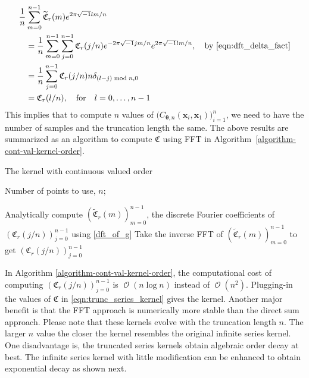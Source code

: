 \documentclass{iitthesis}          %
\DeclareMathOperator{\Order}{{\mathcal O}}
\newcommand{\bm}[1]{\boldsymbol{#1}}
\newcommand{\vtheta}{{\bm{\theta}}}
\newcommand{\vx}{\bm{x}}
\begin{document}
\begin{align*}
\frac{1}{n} &\sum_{m=0}^{n-1} \widetilde{\mathfrak{C}}_{r} (m) e^{2 \pi\sqrt{-1} lm/n} \\
& = \frac{1}{n} \sum_{m=0}^{n-1} 
\sum_{j=0}^{n-1} \mathfrak{C}_{r} (j/n) e^{- 2 \pi\sqrt{-1} jm/n}
e^{2 \pi\sqrt{-1} lm/n}, \quad \text{by \eqref{eqn:dft_delta_fact}}  \\
& = \frac{1}{n}  \sum_{j=0}^{n-1} \mathfrak{C}_{r} (j/n) n \delta_{(l-j) \bmod n, 0} \\
& = \mathfrak{C}_{r} (l/n), \quad \text{for} \quad l=0,\dots,n-1
\end{align*}
This implies that to compute $n$ values of $\biggl( C_{\vtheta, n}(\vx_i, \vx_1) \biggr)_{i=1}^n$, we need to have the number of samples and the truncation length the same. 
The above results are summarized as an algorithm to compute $\mathfrak{C}$ using FFT in Algorithm~\ref{algorithm-cont-val-kernel-order}.
\begin{algorithm}
	\caption{The kernel with continuous valued order}\label{algorithm-cont-val-kernel-order}
	\begin{algorithmic}[1]
	
	\Require
	Number of points to use, $n$; 

	\State Analytically compute $\left(\widetilde{\mathfrak{C}}_{r}(m)\right)_{m=0}^{n-1}$, the discrete Fourier coefficients of $\left(\mathfrak{C}_r(j/n)\right)_{j=0}^{n-1}$ using \eqref{dft_of_g}
	\State Take the inverse FFT of $\left(\widetilde{\mathfrak{C}}_{r}(m)\right)_{m=0}^{n-1}$ to get $\left(\mathfrak{C}_r(j/n)\right)_{j=0}^{n-1}$
	\end{algorithmic}

\end{algorithm}

In Algorithm \ref{algorithm-cont-val-kernel-order}, the computational cost of  computing  $\left(\mathfrak{C}_r(j/n)\right)_{j=0}^{n-1}$ is $\Order(n \log n)$ instead of $\Order(n^2)$. Plugging-in the values of $\mathfrak{C}$ in \eqref{eqn:trunc_series_kernel} gives the kernel. Another major benefit is that the FFT approach is numerically more stable than the direct sum approach. Please note that these kernels evolve with the truncation length $n$. The larger $n$ value the closer the kernel resembles the original infinite series kernel. One disadvantage is, the truncated series kernels obtain algebraic order decay at best. The infinite series kernel with little modification can be enhanced to obtain exponential decay as shown next.
\end{document}
